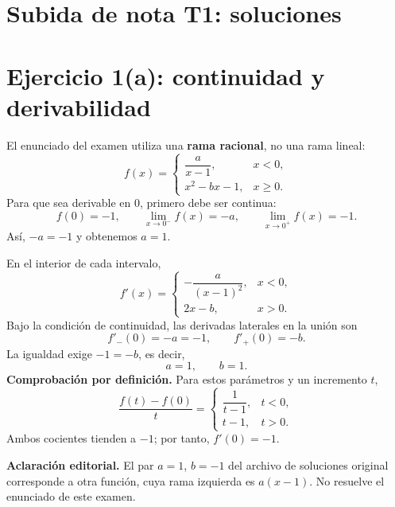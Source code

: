 \documentclass[11pt]{article}
\begin{document}
\section*{Subida de nota T1: soluciones}
\section*{Ejercicio 1(a): continuidad y derivabilidad}
El enunciado del examen utiliza una \textbf{rama racional}, no una rama lineal:
\[f(x)=\begin{cases}\dfrac{a}{x-1},&x<0,\\x^2-bx-1,&x\geq0.\end{cases}\]
Para que sea derivable en $0$, primero debe ser continua:
\[f(0)=-1,\qquad\lim_{x\to0^-}f(x)=-a,\qquad\lim_{x\to0^+}f(x)=-1.\]
Así, $-a=-1$ y obtenemos $a=1$.

En el interior de cada intervalo,
\[f'(x)=\begin{cases}-\dfrac{a}{(x-1)^2},&x<0,\\2x-b,&x>0.\end{cases}\]
Bajo la condición de continuidad, las derivadas laterales en la unión son
\[f'_-(0)=-a=-1,\qquad f'_+(0)=-b.\]
La igualdad exige $-1=-b$, es decir,
\[\boxed{a=1,\qquad b=1}.\]
\textbf{Comprobación por definición.} Para estos parámetros y un incremento $t$,
\[
\frac{f(t)-f(0)}{t}=\begin{cases}\dfrac{1}{t-1},&t<0,\\t-1,&t>0.\end{cases}
\]
Ambos cocientes tienden a $-1$; por tanto, $f'(0)=-1$.

\textbf{Aclaración editorial.} El par $a=1$, $b=-1$ del archivo de soluciones original corresponde a otra función, cuya rama izquierda es $a(x-1)$. No resuelve el enunciado de este examen.
\clearpage
\end{document}
